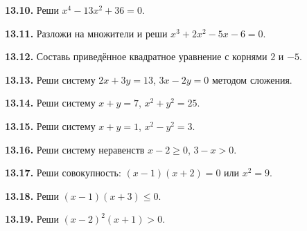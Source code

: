 \noindent\begin{minipage}[t]{\linewidth}\textbf{13.10.} Реши \(x^4-13x^2+36=0\).\par\end{minipage}\par
\noindent\begin{minipage}[t]{\linewidth}\textbf{13.11.} Разложи на множители и реши \(x^3+2x^2-5x-6=0\).\par\end{minipage}\par
\noindent\begin{minipage}[t]{\linewidth}\textbf{13.12.} Составь приведённое квадратное уравнение с корнями \(2\) и \(-5\).\par\end{minipage}\par
\noindent\begin{minipage}[t]{\linewidth}\textbf{13.13.} Реши систему \(2x+3y=13\), \(3x-2y=0\) методом сложения.\par\end{minipage}\par
\noindent\begin{minipage}[t]{\linewidth}\textbf{13.14.}\starmark{} Реши систему \(x+y=7\), \(x^2+y^2=25\).\par\end{minipage}\par
\noindent\begin{minipage}[t]{\linewidth}\textbf{13.15.} Реши систему \(x+y=1\), \(x^2-y^2=3\).\par\end{minipage}\par
\noindent\begin{minipage}[t]{\linewidth}\textbf{13.16.} Реши систему неравенств \(x-2\geq0\), \(3-x>0\).\par\end{minipage}\par
\noindent\begin{minipage}[t]{\linewidth}\textbf{13.17.} Реши совокупность: \((x-1)(x+2)=0\) или \(x^2=9\).\par\end{minipage}\par
\noindent\begin{minipage}[t]{\linewidth}\textbf{13.18.} Реши \((x-1)(x+3)\leq0\).\par\end{minipage}\par
\noindent\begin{minipage}[t]{\linewidth}\textbf{13.19.} Реши \((x-2)^2(x+1)>0\).\par\end{minipage}\par
